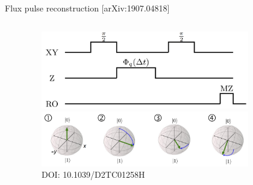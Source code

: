 \documentclass[aspectratio=169,10pt]{beamer}
\begin{document}
\begin{frame}{Flux pulse reconstruction \hfill{\small[arXiv:1907.04818]}}
  \begin{columns}
    \begin{column}{0.4\textwidth}
      \centering
      \vspace{1em}
    \end{column}
    \begin{column}{0.6\textwidth}
      \begin{figure}
        \centering
        \includegraphics[width=0.85\textwidth]{figures/cryoscope_pulse.png}\\
        \vspace{3em}
        \includegraphics[width=0.85\textwidth]{figures/BlochEvolution.png}\\
        {\tiny DOI: 10.1039/D2TC01258H}
      \end{figure}
    \end{column}
  \end{columns}
\end{frame}
\end{document}
